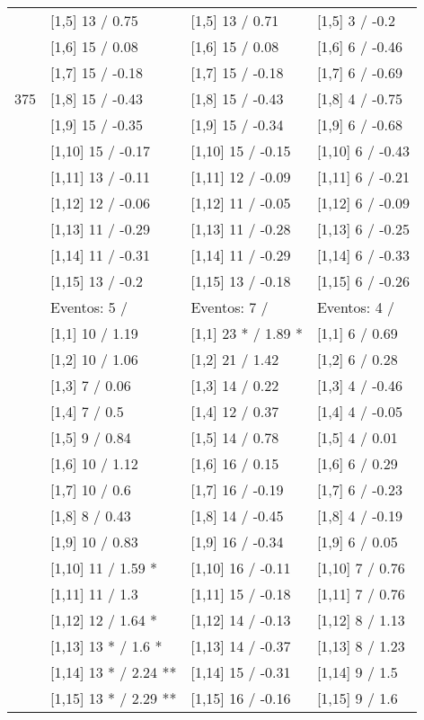 \begin{table}
\begin{tabular}[t]{llll}
 & {}[1,5] 13  / 0.75 & {}[1,5] 13  / 0.71 & {}[1,5] 3  / -0.2\\
 & {}[1,6] 15  / 0.08 & {}[1,6] 15  / 0.08 & {}[1,6] 6  / -0.46\\
 & {}[1,7] 15  / -0.18 & {}[1,7] 15  / -0.18 & {}[1,7] 6  / -0.69\\
375 & {}[1,8] 15  / -0.43 & {}[1,8] 15  / -0.43 & {}[1,8] 4  / -0.75\\
\addlinespace
 & {}[1,9] 15  / -0.35 & {}[1,9] 15  / -0.34 & {}[1,9] 6  / -0.68\\
 & {}[1,10] 15  / -0.17 & {}[1,10] 15  / -0.15 & {}[1,10] 6  / -0.43\\
 & {}[1,11] 13  / -0.11 & {}[1,11] 12  / -0.09 & {}[1,11] 6  / -0.21\\
 & {}[1,12] 12  / -0.06 & {}[1,12] 11  / -0.05 & {}[1,12] 6  / -0.09\\
 & {}[1,13] 11  / -0.29 & {}[1,13] 11  / -0.28 & {}[1,13] 6  / -0.25\\
\addlinespace
 & {}[1,14] 11  / -0.31 & {}[1,14] 11  / -0.29 & {}[1,14] 6  / -0.33\\
 & {}[1,15] 13  / -0.2 & {}[1,15] 13  / -0.18 & {}[1,15] 6  / -0.26\\
 & Eventos:  5 / & Eventos:  7 / & Eventos:  4 /\\
 & {}[1,1] 10  / 1.19 & {}[1,1] 23 * / 1.89 * & {}[1,1] 6  / 0.69\\
 & {}[1,2] 10  / 1.06 & {}[1,2] 21  / 1.42 & {}[1,2] 6  / 0.28\\
\addlinespace
 & {}[1,3] 7  / 0.06 & {}[1,3] 14  / 0.22 & {}[1,3] 4  / -0.46\\
 & {}[1,4] 7  / 0.5 & {}[1,4] 12  / 0.37 & {}[1,4] 4  / -0.05\\
 & {}[1,5] 9  / 0.84 & {}[1,5] 14  / 0.78 & {}[1,5] 4  / 0.01\\
 & {}[1,6] 10  / 1.12 & {}[1,6] 16  / 0.15 & {}[1,6] 6  / 0.29\\
 & {}[1,7] 10  / 0.6 & {}[1,7] 16  / -0.19 & {}[1,7] 6  / -0.23\\
\addlinespace
500 & {}[1,8] 8  / 0.43 & {}[1,8] 14  / -0.45 & {}[1,8] 4  / -0.19\\
 & {}[1,9] 10  / 0.83 & {}[1,9] 16  / -0.34 & {}[1,9] 6  / 0.05\\
 & {}[1,10] 11  / 1.59 * & {}[1,10] 16  / -0.11 & {}[1,10] 7  / 0.76\\
 & {}[1,11] 11  / 1.3 & {}[1,11] 15  / -0.18 & {}[1,11] 7  / 0.76\\
 & {}[1,12] 12  / 1.64 * & {}[1,12] 14  / -0.13 & {}[1,12] 8  / 1.13\\
\addlinespace
 & {}[1,13] 13 * / 1.6 * & {}[1,13] 14  / -0.37 & {}[1,13] 8  / 1.23\\
 & {}[1,14] 13 * / 2.24 ** & {}[1,14] 15  / -0.31 & {}[1,14] 9  / 1.5\\
 & {}[1,15] 13 * / 2.29 ** & {}[1,15] 16  / -0.16 & {}[1,15] 9  / 1.6\\
\bottomrule
\end{tabular}
\end{table}
